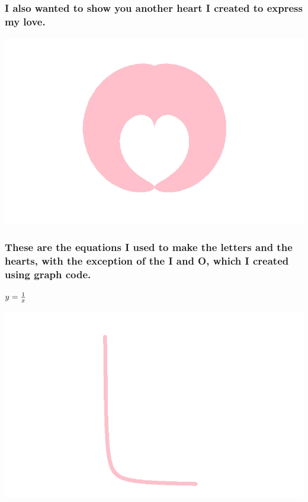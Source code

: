 \documentclass[
  12pt,
]{article}
\begin{document}
\newpage

\hfill\break
\hfill\break
\hfill\break
\hfill\break
\hfill\break
\hfill\break
\hfill\break
\hfill\break
\hfill\break
\hfill\break
\hfill\break
\hfill\break

\hfill\break
\hfill\break
\hfill\break

\hypertarget{i-also-wanted-to-show-you-another-heart-i-created-to-express-my-love.}{%
\subsubsection{I also wanted to show you another heart I created to
express my
love.}\label{i-also-wanted-to-show-you-another-heart-i-created-to-express-my-love.}}

\begin{center}\includegraphics[width=0.5\linewidth]{Heart1} \end{center}
\newpage

\hypertarget{these-are-the-equations-i-used-to-make-the-letters-and-the-hearts-with-the-exception-of-the-i-and-o-which-i-created-using-graph-code.}{%
\subsubsection{These are the equations I used to make the letters and
the hearts, with the exception of the I and O, which I created using
graph
code.}\label{these-are-the-equations-i-used-to-make-the-letters-and-the-hearts-with-the-exception-of-the-i-and-o-which-i-created-using-graph-code.}}

\({\LARGE y = \frac{1}{x}}\)

\includegraphics[width=0.5\linewidth]{L}
\end{document}
